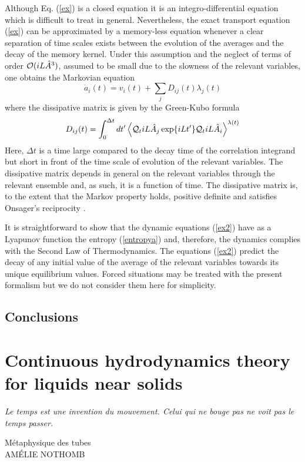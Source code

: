 \documentclass[a4paper,openright,12pt]{book}
\begin{document}
Although Eq.  (\ref{ex})  is a closed
equation it is an integro-differential  equation which is difficult to
treat  in   general.   Nevertheless,  the  exact   transport  equation
(\ref{ex}) can  be approximated by  a memory-less equation  whenever a
clear separation  of time scales  exists between the evolution  of the
averages and  the decay of  the memory kernel. Under  this assumption
and the  neglect of terms of  order ${\cal O}( iL\hat{A}^3)$,  assumed to be
small due to  the slowness of the relevant variables,  one obtains the
Markovian equation \cite{Grabert1982}
\begin{equation}
\dot{a}_i(t) = v_i(t) + \sum_j D_{ij}(t) \lambda_j(t)
\label{ex2}
\end{equation}
where  the  dissipative matrix  is  given  by  the Green-Kubo  formula
\begin{equation}
D_{ij}(t)=\int_0^{\Delta t} dt'\left\langle 
{\cal Q}_t iL\hat{A}_j\exp\{iLt'\}{\cal Q}_t iL\hat{A}_i
\right\rangle^{\lambda(t)}
\label{dij}
\end{equation}
Here,  $\Delta t$ is  a  time large  compared  to the  decay  time of  the
correlation  integrand  but  short  in  front of  the  time  scale  of
evolution of  the relevant variables.  The  dissipative matrix depends
in general  on the  relevant variables  through the  relevant ensemble
and, as such, it is a function of time.  The dissipative matrix is, to
the  extent that  the  Markov property  holds,  positive definite  and
satisfies Onsager's reciprocity \cite{Grabert1982}.

It is straightforward  to show that the  dynamic equations (\ref{ex2})
have  as  a  Lyapunov   function  the  entropy  (\ref{entropya})  and,
therefore,   the   dynamics   complies   with  the   Second   Law   of
Thermodynamics.  The  equations (\ref{ex2})  predict the decay  of any
initial value  of the  average of the  relevant variables  towards its
unique equilibrium  values. Forced situations may  be treated
with the present  formalism \cite{Grabert1982} but we  do not consider
them here for simplicity.


\section{Conclusions}



\chapter{Continuous hydrodynamics theory for liquids near solids}\label{Chap:Theory}
\epigraph{\textit{Le temps est une invention du mouvement. Celui qui ne bouge pas ne voit pas le temps passer.}}{Métaphysique des tubes \\ AMÉLIE NOTHOMB}
\end{document}
